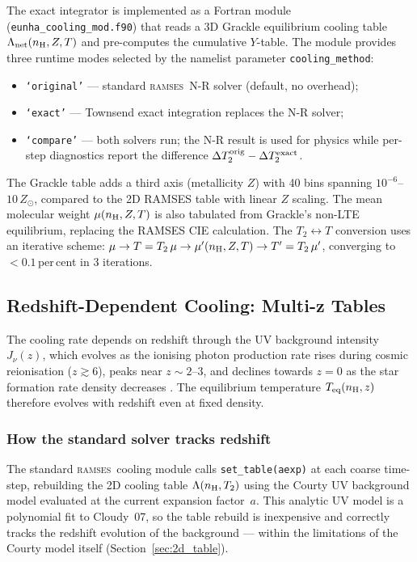 \documentclass[fleqn,usenatbib]{mnras}
\newcommand{\ramses}{\textsc{ramses}}
\newcommand{\code}[1]{\texttt{#1}}
\begin{document}
The exact integrator is implemented as a Fortran module
(\code{eunha\_cooling\_mod.f90}) that reads a 3D Grackle equilibrium
cooling table $\Lambda_{\rm net}(n_{\rm H}, Z, T)$ and pre-computes
the cumulative $Y$-table.  The module provides three runtime modes
selected by the namelist parameter \code{cooling\_method}:
\begin{itemize}
  \item \code{`original'} --- standard \ramses\ N-R solver (default,
    no overhead);
  \item \code{`exact'} --- Townsend exact integration replaces the N-R
    solver;
  \item \code{`compare'} --- both solvers run; the N-R result is used
    for physics while per-step diagnostics report the difference
    $\Delta T_2^{\rm orig} - \Delta T_2^{\rm exact}$.
\end{itemize}

The Grackle table adds a third axis (metallicity $Z$) with 40 bins
spanning $10^{-6}$--$10\,Z_\odot$, compared to the 2D RAMSES table
with linear $Z$ scaling.  The mean molecular weight $\mu(n_{\rm H}, Z, T)$
is also tabulated from Grackle's non-LTE equilibrium, replacing the
RAMSES CIE calculation.  The $T_2 \leftrightarrow T$ conversion uses an
iterative scheme: $\mu \to T = T_2\,\mu \to \mu'(n_{\rm H}, Z, T) \to
T' = T_2\,\mu'$, converging to $<0.1$\,per\,cent in 3 iterations.


\subsection{Redshift-Dependent Cooling: Multi-z Tables}
\label{sec:multi_z}

The cooling rate depends on redshift through the UV background
intensity $J_\nu(z)$, which evolves as the ionising photon production
rate rises during cosmic reionisation ($z \gtrsim 6$), peaks near
$z \sim 2$--$3$, and declines towards $z = 0$ as the star formation
rate density decreases \citep{HM2012, FG2020}.
The equilibrium temperature
$T_{\rm eq}(n_{\rm H}, z)$ therefore evolves with redshift even at
fixed density.

\subsubsection{How the standard solver tracks redshift}

The standard \ramses\ cooling module calls \code{set\_table(aexp)} at
each coarse time-step, rebuilding the 2D cooling table
$\Lambda(n_{\rm H}, T_2)$ using the Courty UV background model
evaluated at the current expansion factor~$a$.  This analytic UV model
is a polynomial fit to Cloudy~07, so the table rebuild is
inexpensive and correctly tracks the redshift evolution of the
background --- within the limitations of the Courty model itself
(Section~\ref{sec:2d_table}).
\end{document}
